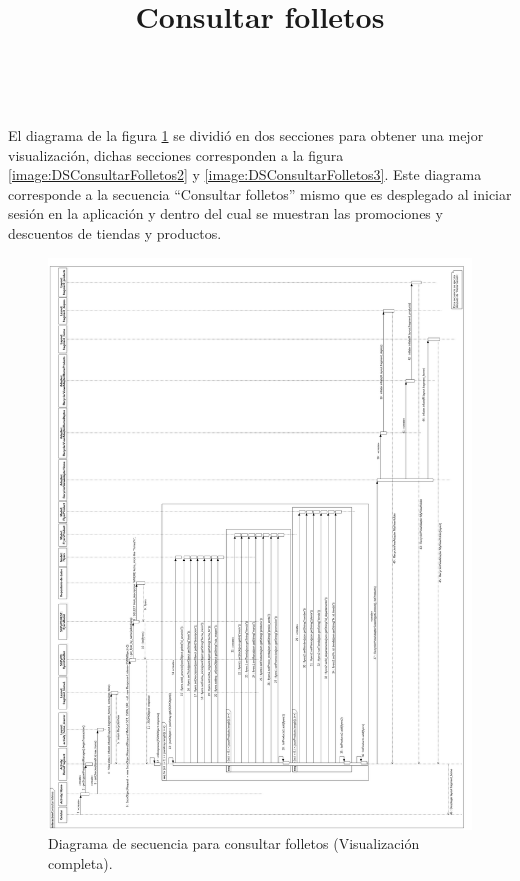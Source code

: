 \title{\textbf{Consultar folletos}}
\\ \par
El diagrama de la figura \ref{image:DSConsultarFolletos1} se dividió en dos secciones para obtener una mejor visualización, dichas secciones corresponden a la figura \ref{image:DSConsultarFolletos2} y \ref{image:DSConsultarFolletos3}. Este diagrama corresponde a la secuencia ``Consultar folletos'' mismo que es desplegado al iniciar sesión en la aplicación y dentro del cual se muestran las promociones y descuentos de tiendas y productos.
\FloatBarrier
\begin{figure}[htbp!]
		\centering
			\includegraphics[width=.8 \textwidth]{imagenes/Diagramas_UserApp/Nuevos_diagramas/Horizontal/consultarFolletos}
		\caption{Diagrama de secuencia para consultar folletos (Visualización completa).}
		\label{image:DSConsultarFolletos1}
\end{figure}
\FloatBarrier

